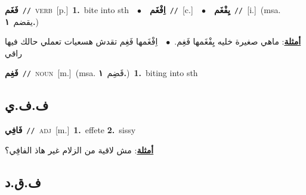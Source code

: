 \documentclass[10pt,a4paper,twoside]{article} %
\begin{document}
\begin{multicols}{2}
{\setlength\topsep{0pt}\textbf{\foreignlanguage{arabic}{فَغَم}}\ {\color{gray}\texttt{//}\color{black}}\ \textsc{verb}\ [p.]\ \textbf{1.}~bite into sth\ \ $\bullet$\ \ \setlength\topsep{0pt}\textbf{\foreignlanguage{arabic}{اِفْغَم}}\ {\color{gray}\texttt{//}\color{black}}\ [c.]\ \ $\bullet$\ \ \setlength\topsep{0pt}\textbf{\foreignlanguage{arabic}{يِفْغَم}}\ {\color{gray}\texttt{//}\color{black}}\ [i.]\ \color{gray}(msa. \foreignlanguage{arabic}{يقضم}~\foreignlanguage{arabic}{\textbf{١.}})\color{black}\  \begin{flushright}\color{gray}\foreignlanguage{arabic}{\textbf{\underline{\foreignlanguage{arabic}{أمثلة}}}: ماهي صغيرة خليه يِفْغَمها فَغِم.\ $\bullet$\ \  اِفْغَمها فَغِم تقدش هسعيات تعملي حالك فيها راقي}\end{flushright}\color{black}} \vspace{2mm}

{\setlength\topsep{0pt}\textbf{\foreignlanguage{arabic}{فَغِم}}\ {\color{gray}\texttt{//}\color{black}}\ \textsc{noun}\ [m.]\ \color{gray}(msa. \foreignlanguage{arabic}{قَضِم}~\foreignlanguage{arabic}{\textbf{١.}})\color{black}\ \textbf{1.}~biting into sth\ } \vspace{2mm}

\vspace{-3mm}
\subsection*{\color{blue}\foreignlanguage{arabic}{ف.ف.ي}\color{blue}{ (ntws)}} 

{\setlength\topsep{0pt}\textbf{\foreignlanguage{arabic}{فَافِي}}\ {\color{gray}\texttt{//}\color{black}}\ \textsc{adj}\ [m.]\ \textbf{1.}~effete  \textbf{2.}~sissy\  \begin{flushright}\color{gray}\foreignlanguage{arabic}{\textbf{\underline{\foreignlanguage{arabic}{أمثلة}}}: مش لاقية من الزلام غير هاذ الفافِي؟}\end{flushright}\color{black}} \vspace{2mm}

\vspace{-3mm}
\subsection*{\color{blue}\foreignlanguage{arabic}{ف.ق.د}\color{blue}{}} 


\end{multicols}
\end{document}
